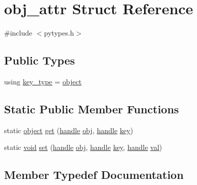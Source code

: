 \hypertarget{structobj__attr}{}\section{obj\+\_\+attr Struct Reference}
\label{structobj__attr}


{\ttfamily \#include $<$pytypes.\+h$>$}

\subsection*{Public Types}
\begin{DoxyCompactItemize}
\item 
using \mbox{\hyperlink{structobj__attr_a6e74a19f662e54a2b5e5104d32cbaeb9}{key\+\_\+type}} = \mbox{\hyperlink{classobject}{object}}
\end{DoxyCompactItemize}
\subsection*{Static Public Member Functions}
\begin{DoxyCompactItemize}
\item 
static \mbox{\hyperlink{classobject}{object}} \mbox{\hyperlink{structobj__attr_a3b7c2c8831bed4aa4c058e2252b8c12f}{get}} (\mbox{\hyperlink{classhandle}{handle}} \mbox{\hyperlink{_s_d_l__opengl__glext_8h_a0c0d4701a6c89f4f7f0640715d27ab26}{obj}}, \mbox{\hyperlink{classhandle}{handle}} \mbox{\hyperlink{setobject_8h_ab06f52e01abcbec81a27c56570d3c10b}{key}})
\item 
static \mbox{\hyperlink{_s_d_l__opengles2__gl2ext_8h_ae5d8fa23ad07c48bb609509eae494c95}{void}} \mbox{\hyperlink{structobj__attr_a16b65196c72f9a16bc85232aa3383b3b}{set}} (\mbox{\hyperlink{classhandle}{handle}} \mbox{\hyperlink{_s_d_l__opengl__glext_8h_a0c0d4701a6c89f4f7f0640715d27ab26}{obj}}, \mbox{\hyperlink{classhandle}{handle}} \mbox{\hyperlink{setobject_8h_ab06f52e01abcbec81a27c56570d3c10b}{key}}, \mbox{\hyperlink{classhandle}{handle}} \mbox{\hyperlink{_s_d_l__opengl__glext_8h_a26942fd2ed566ef553eae82d2c109c8f}{val}})
\end{DoxyCompactItemize}


\subsection{Member Typedef Documentation}
\mbox{\label{structobj__attr_a6e74a19f662e54a2b5e5104d32cbaeb9}} 
